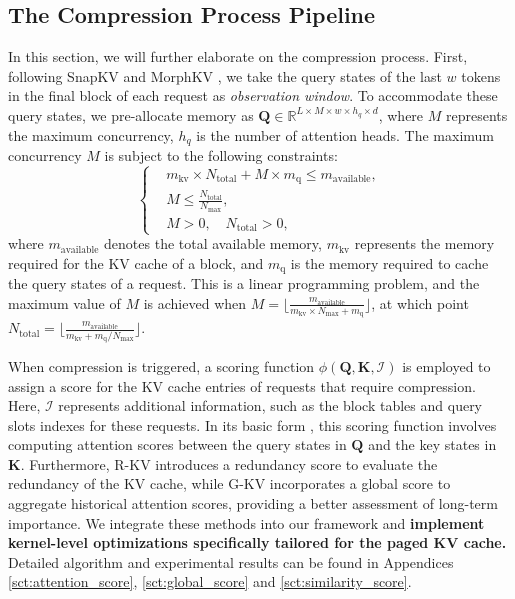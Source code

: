 \documentclass[11pt]{article}
\begin{document}
\subsection{The Compression Process Pipeline}
In this section, we will further elaborate on the compression process. First, following SnapKV \citep{li2024snapkv} and MorphKV \citep{morghkv},  we take the query states of the last $w$ tokens in the final block of each request as  \textit{observation window}. To accommodate these query states, we pre-allocate memory as $\mathbf Q \in \mathbb{R}^{L \times M \times w \times h_{q} \times d}$, where $M$ represents the maximum concurrency, $h_{q}$ is the number of attention heads.
The maximum concurrency $M$ is subject to the following constraints:  
\begin{equation}  
\left\{
\begin{aligned}
    &m_{\text{kv}} \times N_{\text{total}} + M \times m_{\text{q}} \leq m_{\text{available}}, \\
    &M \leq \frac{N_{\text{total}}}{N_{\max}}, \\
    &M > 0, \quad N_{\text{total}} > 0,
\end{aligned}
\right.
\label{eq:max_c}
\end{equation}  
where $m_{\text{available}}$ denotes the total available memory, $m_{\text{kv}}$ represents the memory required for the KV cache of a block, and $m_{\text{q}}$ is the memory required to cache the query states of a request. This is a linear programming problem, and the maximum value of $M$ is achieved when  $M = \lfloor \frac{m_{\text{available}}}{m_{\text{kv}}\times N_{\max}+m_{\text{q}}}\rfloor$, at which point $N_{\text{total}} = \lfloor\frac{m_{\text{available}}}{m_{\text{kv}}+{m_{\text{q}}}/{N_{\max}}} \rfloor$.

When compression is triggered, a scoring function $\phi(\mathbf Q,\mathbf K, \mathcal I)$ is employed to assign a score for the KV cache entries of requests that require compression. Here, $\mathcal{I}$ represents additional information, such as the block tables and query slots indexes for these requests. In its basic form , this scoring function involves computing attention scores between the query states in $\mathbf{Q}$ and the key states in $\mathbf{K}$. Furthermore, R-KV \citep{rkv} introduces a redundancy score to evaluate the redundancy of the KV cache, while G-KV \citep{gkv} incorporates a global score to aggregate historical attention scores, providing a better assessment of long-term importance. We integrate these methods into our framework and \textbf{implement kernel-level optimizations specifically tailored for the paged KV cache.} Detailed algorithm and experimental results can be found in Appendices \ref{sct:attention_score}, \ref{sct:global_score} and \ref{sct:similarity_score}. 
\end{document}
